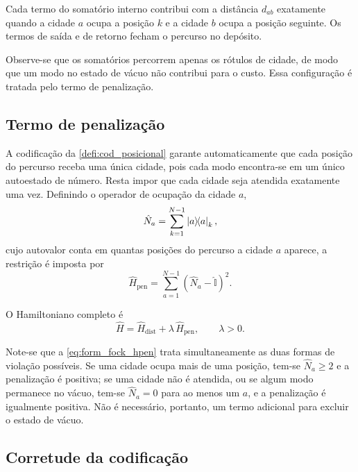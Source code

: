         Cada termo do somatório interno contribui com a distância $d_{ab}$ exatamente quando a cidade $a$ ocupa a posição $k$ e a cidade $b$ ocupa a posição seguinte. Os termos de saída e de retorno fecham o percurso no depósito.

        Observe-se que os somatórios percorrem apenas os rótulos de cidade, de modo que um modo no estado de vácuo não contribui para o custo. Essa configuração é tratada pelo termo de penalização.

    \subsection{Termo de penalização}\label{subsec:form_fock_penal}

        A codificação da \autoref{defi:cod_posicional} garante automaticamente que cada posição do percurso receba uma única cidade, pois cada modo encontra-se em um único autoestado de número. Resta impor que cada cidade seja atendida exatamente uma vez. Definindo o operador de ocupação da cidade $a$,
        \begin{equation}\label{eq:form_fock_Na}
            \hat{N}_a = \sum_{k=1}^{N-1} \ketbra{a}{a}_k ,
        \end{equation}
        \noindent cujo autovalor conta em quantas posições do percurso a cidade $a$ aparece, a restrição é imposta por
        \begin{equation}\label{eq:form_fock_hpen}
            \hat{H}_{\text{pen}} = \sum_{a=1}^{N-1} \left( \hat{N}_a - \hat{\mathbb{I}} \right)^2 .
        \end{equation}

        O Hamiltoniano completo é
        \begin{equation}\label{eq:form_fock_total}
            \hat{H} = \hat{H}_{\text{dist}} + \lambda\, \hat{H}_{\text{pen}} ,
            \qquad \lambda > 0 .
        \end{equation}

        Note-se que a \autoref{eq:form_fock_hpen} trata simultaneamente as duas formas de violação possíveis. Se uma cidade ocupa mais de uma posição, tem-se $\hat{N}_a \geq 2$ e a penalização é positiva; se uma cidade não é atendida, ou se algum modo permanece no vácuo, tem-se $\hat{N}_a = 0$ para ao menos um $a$, e a penalização é igualmente positiva. Não é necessário, portanto, um termo adicional para excluir o estado de vácuo.

    \subsection{Corretude da codificação}\label{subsec:form_fock_corretude}

